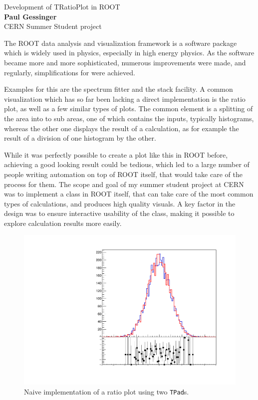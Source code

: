 \begin{centering} 
  \huge Development of TRatioPlot in ROOT \\ 
  \large \textbf{Paul Gessinger} \\ 
  \large CERN Summer Student project \\ 
\end{centering} 
\vspace{1.5cm}
\normalsize

\noindent The ROOT data analysis and visualization framework is a software package which
is widely used in physics, especially in high energy physics. As the software became more
and more sophisticated, numerous improvements were made, and regularly, simplifications
for were achieved. 

Examples for this are the spectrum fitter and the stack facility.
A common visualization which has so far been lacking a direct implementation is the
ratio plot, as well as a few similar types of plots. The common element is a splitting
of the area into to sub areas, one of which contains the inputs, typically histograms,
whereas the other one displays the result of a calculation, as for example the result 
of a division of one histogram by the other.

While it was perfectly possible to create a plot like this in ROOT before, achieving 
a good looking result could be tedious, which led to a large number of people writing
automation on top of ROOT itself, that would take care of the process for them. The scope
and goal of my summer student project at CERN was to implement a class in ROOT itself,
that can take care of the most common types of calculations, and produces high quality
visuals. A key factor in the design was to ensure interactive usability of the class,
making it possible to explore calculation results more easily.

\begin{figure}
  \centering
  \includegraphics[width=1.0\linewidth]{assets/bad.pdf}
  \caption{Naive implementation of a ratio plot using two \texttt{TPad}s.}
  \label{fig:bad}
\end{figure}

